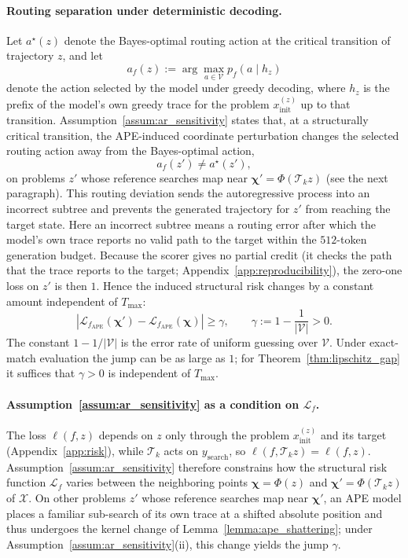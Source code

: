 \paragraph{Routing separation under deterministic decoding.}
Let $a^\star(z)$ denote the Bayes-optimal routing action at the critical
transition of trajectory $z$, and let
\[
a_f(z) := \arg\max_{a\in\mathcal V} p_f(a\mid h_z)
\]
denote the action selected by the model under greedy decoding, where $h_z$ is the prefix of the model's own greedy trace for the problem $x_{\mathrm{init}}^{(z)}$ up to that transition. Assumption~\ref{assum:ar_sensitivity} states that, at a structurally critical transition, the APE-induced
coordinate perturbation changes the selected routing action away from the Bayes-optimal
action,
\[
a_f(z') \neq a^\star(z'),
\]
on problems $z'$ whose reference searches map near $\boldsymbol{\chi}'=\Phi(\mathcal T_k z)$ (see the next paragraph). This routing
deviation sends the autoregressive process into an incorrect subtree and prevents
the generated trajectory for $z'$ from reaching the target state. Here an incorrect subtree means a routing error after which the model's own trace reports no valid path to the target within the $512$-token generation budget. Because the scorer gives no partial credit (it checks the path that the trace reports to the target; Appendix~\ref{app:reproducibility}), the zero-one loss on $z'$ is then $1$. Hence the induced
structural risk changes by a constant amount independent of $T_{\max}$:
\begin{equation}
\left|
\mathcal{L}_{f_{\mathrm{APE}}}(\boldsymbol{\chi}')
-
\mathcal{L}_{f_{\mathrm{APE}}}(\boldsymbol{\chi})
\right|
\ge
\gamma,
\qquad
\gamma := 1-\frac{1}{|\mathcal V|}>0.
\end{equation}
The constant $1-1/|\mathcal V|$ is the error rate of uniform guessing over $\mathcal V$.
Under exact-match evaluation the jump can be as large as $1$; for
Theorem~\ref{thm:lipschitz_gap} it suffices that $\gamma>0$ is independent of
$T_{\max}$.

\paragraph{Assumption~\ref{assum:ar_sensitivity} as a condition on $\mathcal{L}_f$.}
The loss $\ell(f,z)$ depends on $z$ only through the problem $x_{\mathrm{init}}^{(z)}$ and its target (Appendix~\ref{app:risk}), while $\mathcal{T}_k$ acts on $y_{\mathrm{search}}$, so $\ell(f,\mathcal{T}_k z)=\ell(f,z)$. Assumption~\ref{assum:ar_sensitivity} therefore constrains how the structural risk function $\mathcal{L}_f$ varies between the neighboring points $\boldsymbol{\chi}=\Phi(z)$ and $\boldsymbol{\chi}'=\Phi(\mathcal{T}_k z)$ of $\mathcal{X}$. On other problems $z'$ whose reference searches map near $\boldsymbol{\chi}'$, an APE model places a familiar sub-search of its own trace at a shifted absolute position and thus undergoes the kernel change of Lemma~\ref{lemma:ape_shattering}; under Assumption~\ref{assum:ar_sensitivity}(ii), this change yields the jump $\gamma$.

